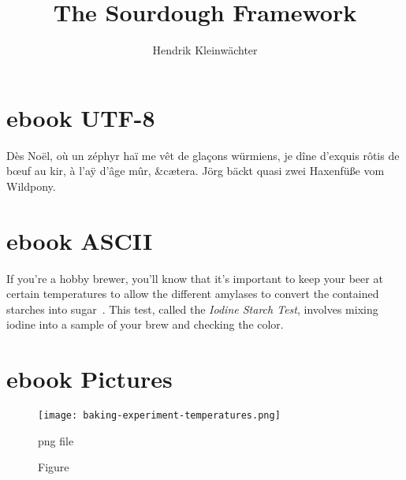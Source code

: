 \documentclass[paper=a4, twoside=false, fontsize=12pt, parskip=half,
                bibliography=totoc, listof=totoc]{scrbook}
\author{Hendrik Kleinwächter}
\title{The Sourdough Framework}
\begin{document}
%
\titlepage

{%
 \hypersetup{hidelinks}
 \ifdefined\HCode\else\tableofcontents\fi
}

\chapter{ebook UTF-8}
Dès Noël, où un zéphyr haï me vêt de glaçons würmiens, je dîne d’exquis rôtis
de bœuf au kir, à l’aÿ d’âge mûr, \&cætera.  Jörg bäckt quasi zwei Haxenfüße
vom Wildpony.

\chapter{ebook ASCII}
If you're a hobby brewer, you'll know that it's important to keep your beer at
certain temperatures to allow the different amylases to convert the contained
starches into sugar~\cite{beer+amylase}.
This test, called the \emph{Iodine Starch Test}, involves mixing iodine into
a sample of your brew and checking the color.

\chapter{ebook Pictures}
\begin{figure}[!htb]
  \texttt{[image: baking-experiment-temperatures.png]}
  \caption[Surface temperature for different steaming methods]{png file}
\end{figure}

\begin{figure}[!htb]
 \begin{center}
   
   \caption{Figure}
   \label{flc:liquid-starter-conversion}
 \end{center}
\end{figure}

\begin{flowchart}[!htb]
 \begin{center}
   
   \caption{Flowchart}
   \label{flc:liquid-starter-conversion}
 \end{center}
\end{flowchart}
{%
\hypersetup{hidelinks}
\listoffigures
}
\printbibliography
\end{document}
